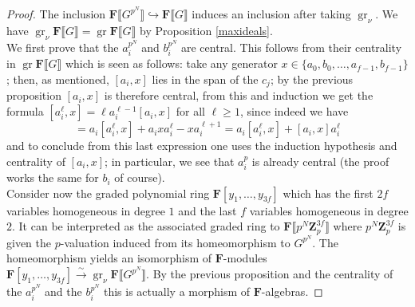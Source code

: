 \documentclass[10pt,a4paper]{amsart}
\DeclareMathOperator{\gr}{gr}
\begin{document}
	\begin{proof}
		The inclusion $\mathbf F\llbracket G^{p^N}\rrbracket\hookrightarrow\mathbf F\llbracket G\rrbracket$ induces an inclusion after taking $\gr_\nu$. We have $\gr_\nu\mathbf F\llbracket G\rrbracket=\gr\mathbf F\llbracket G\rrbracket$ by Proposition \ref{maxideals}.\\
		We first prove that the $a_i^{p^N}$ and $b_i^{p^N}$ are central. This follows from their centrality in $\gr\mathbf F\llbracket G\rrbracket$ which is seen as follows: take any generator $x\in\{a_0,b_0,\dots,a_{f-1},b_{f-1}\}$; then, as mentioned, $[a_i,x]$ lies in the span of the $c_j$; by the previous proposition $[a_i,x]$ is therefore central, from this and induction we get the formula $[a_i^\ell,x]=\ell a_i^{\ell-1}[a_i,x]$ for all $\ell\geq1$, since indeed we have \begin{equation*}
			[a_i^{\ell+1},x]=a_i[a_i^\ell,x]+a_ixa_i^\ell-xa_i^{\ell+1}=a_i[a_i^\ell,x]+[a_i,x]a_i^\ell
		\end{equation*} and to conclude from this last expression one uses the induction hypothesis and centrality of $[a_i,x]$; in particular, we see that $a_i^p$ is already central (the proof works the same for $b_i$ of course).\\
		Consider now the graded polynomial ring $\mathbf F[y_1,\dots,y_{3f}]$ which has the first $2f$ variables homogeneous in degree $1$ and the last $f$ variables homogeneous in degree $2$. It can be interpreted as the associated graded ring to $\mathbf F\llbracket p^N\mathbf Z_p^{3f}\rrbracket$ where $p^N\mathbf Z_p^{3f}$ is given the $p$-valuation induced from its homeomorphism to $G^{p^N}$. The homeomorphism yields an isomorphism of $\mathbf F$-modules $\mathbf F[y_1,\dots,y_{3f}]\xrightarrow{\sim}\gr_\nu\mathbf F\llbracket G^{p^N}\rrbracket$. By the previous proposition and the centrality of the $a_i^{p^N}$ and the $b_i^{p^N}$ this is actually a morphism of $\mathbf F$-algebras.
	\end{proof}
\end{document}
